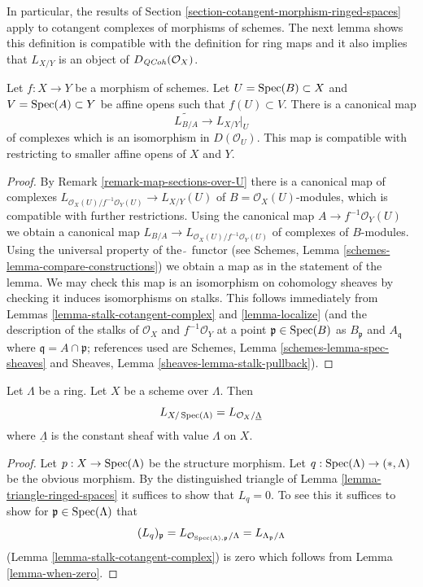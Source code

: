 \noindent
In particular, the results of
Section \ref{section-cotangent-morphism-ringed-spaces} apply
to cotangent complexes of morphisms of schemes.
The next lemma shows this definition is compatible with the definition
for ring maps and it also implies that $L_{X/Y}$ is an
object of $D_{\mathit{QCoh}}(\mathcal{O}_X)$.

\begin{lemma}
\label{lemma-morphism-affine-schemes}
Let $f : X \to Y$ be a morphism of schemes. Let $U = \mathop{\mathrm{Spec}}(B) \subset X$
and $V = \mathop{\mathrm{Spec}}(A) \subset Y$ be affine opens such that $f(U) \subset V$.
There is a canonical map
$$
\widetilde{L_{B/A}} \longrightarrow L_{X/Y}|_U
$$
of complexes which is an isomorphism in $D(\mathcal{O}_U)$.
This map is compatible with restricting to smaller affine opens
of $X$ and $Y$.
\end{lemma}

\begin{proof}
By Remark \ref{remark-map-sections-over-U}
there is a canonical map of complexes
$L_{\mathcal{O}_X(U)/f^{-1}\mathcal{O}_Y(U)} \to L_{X/Y}(U)$
of $B = \mathcal{O}_X(U)$-modules, which is compatible
with further restrictions. Using the canonical map
$A \to f^{-1}\mathcal{O}_Y(U)$ we obtain a canonical map
$L_{B/A} \to L_{\mathcal{O}_X(U)/f^{-1}\mathcal{O}_Y(U)}$
of complexes of $B$-modules.
Using the universal property of the $\widetilde{\ }$
functor (see Schemes, Lemma \ref{schemes-lemma-compare-constructions})
we obtain a map as in the statement of the lemma.
We may check this map is an isomorphism on cohomology sheaves
by checking it induces isomorphisms on stalks.
This follows immediately from
Lemmas \ref{lemma-stalk-cotangent-complex} and \ref{lemma-localize}
(and the description of the stalks of
$\mathcal{O}_X$ and $f^{-1}\mathcal{O}_Y$
at a point $\mathfrak p \in \mathop{\mathrm{Spec}}(B)$ as $B_\mathfrak p$ and
$A_\mathfrak q$ where $\mathfrak q = A \cap \mathfrak p$; references
used are Schemes, Lemma \ref{schemes-lemma-spec-sheaves}
and
Sheaves, Lemma \ref{sheaves-lemma-stalk-pullback}).
\end{proof}

\begin{lemma}
\label{lemma-scheme-over-ring}
Let $\Lambda$ be a ring. Let $X$ be a scheme over $\Lambda$.
Then
$$
L_{X/\mathop{\mathrm{Spec}}(\Lambda)} = L_{\mathcal{O}_X/\underline{\Lambda}}
$$
where $\underline{\Lambda}$ is the constant sheaf with value
$\Lambda$ on $X$.
\end{lemma}

\begin{proof}
Let $p : X \to \mathop{\mathrm{Spec}}(\Lambda)$ be the structure morphism.
Let $q : \mathop{\mathrm{Spec}}(\Lambda) \to (*, \Lambda)$ be the obvious morphism.
By the distinguished triangle of Lemma \ref{lemma-triangle-ringed-spaces}
it suffices to show that $L_q = 0$. To see this it suffices to
show for $\mathfrak p \in \mathop{\mathrm{Spec}}(\Lambda)$ that
$$
(L_q)_\mathfrak p =
L_{\mathcal{O}_{\mathop{\mathrm{Spec}}(\Lambda), \mathfrak p}/\Lambda} =
L_{\Lambda_\mathfrak p/\Lambda}
$$
(Lemma \ref{lemma-stalk-cotangent-complex})
is zero which follows from Lemma \ref{lemma-when-zero}.
\end{proof}






